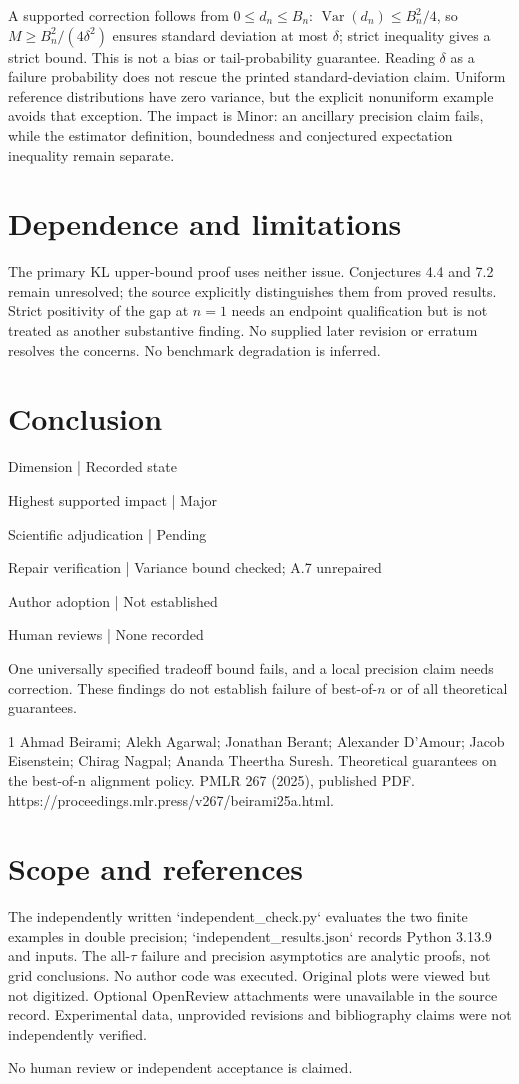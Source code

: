 \documentclass[10pt]{article}
\begin{document}
A supported correction follows from \(0\le d_n\le B_n\): \(\operatorname{Var}(d_n)\le B_n^2/4\), so \(M\ge B_n^2/(4\delta^2)\) ensures standard deviation at most \(\delta\); strict inequality gives a strict bound. This is not a bias or tail-probability guarantee. Reading \(\delta\) as a failure probability does not rescue the printed standard-deviation claim. Uniform reference distributions have zero variance, but the explicit nonuniform example avoids that exception. The impact is Minor: an ancillary precision claim fails, while the estimator definition, boundedness and conjectured expectation inequality remain separate.\par
\section*{Dependence and limitations}
The primary KL upper-bound proof uses neither issue. Conjectures 4.4 and 7.2 remain unresolved; the source explicitly distinguishes them from proved results. Strict positivity of the gap at \(n=1\) needs an endpoint qualification but is not treated as another substantive finding. No supplied later revision or erratum resolves the concerns. No benchmark degradation is inferred.\par
\section*{Conclusion}
Dimension | Recorded state\par
Highest supported impact | Major\par
Scientific adjudication | Pending\par
Repair verification | Variance bound checked; A.7 unrepaired\par
Author adoption | Not established\par
Human reviews | None recorded\par
One universally specified tradeoff bound fails, and a local precision claim needs correction. These findings do not establish failure of best-of-\(n\) or of all theoretical guarantees.\par
1 Ahmad Beirami; Alekh Agarwal; Jonathan Berant; Alexander D’Amour; Jacob Eisenstein; Chirag Nagpal; Ananda Theertha Suresh. Theoretical guarantees on the best-of-n alignment policy. PMLR 267 (2025), published PDF. https://proceedings.mlr.press/v267/beirami25a.html.\par
\section*{Scope and references}
The independently written `independent\_check.py` evaluates the two finite examples in double precision; `independent\_results.json` records Python 3.13.9 and inputs. The all-\(\tau\) failure and precision asymptotics are analytic proofs, not grid conclusions. No author code was executed. Original plots were viewed but not digitized. Optional OpenReview attachments were unavailable in the source record. Experimental data, unprovided revisions and bibliography claims were not independently verified.\par
No human review or independent acceptance is claimed.\par
\end{document}
